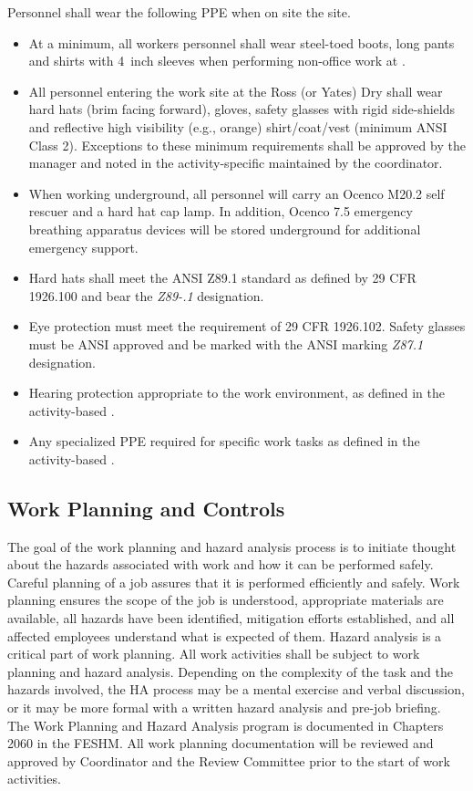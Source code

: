 Personnel shall wear the following PPE when on site the  site.
\begin{itemize}
\item At a minimum, all workers personnel shall wear
  steel-toed boots, long pants and shirts with 4~inch sleeves when
  performing non-office work at . 
  \item All personnel entering the work site at the Ross (or Yates) Dry
    shall wear hard hats (brim facing forward), gloves,
    safety glasses with rigid side-shields and reflective high
    visibility (e.g., orange) shirt/coat/vest (minimum ANSI Class 2).
    Exceptions to these minimum requirements shall be approved by the
      manager and noted in the
    activity-specific  maintained by the   coordinator.
  \item When working underground, all personnel will carry an Ocenco M20.2 self rescuer
    and a hard hat cap lamp. In addition, Ocenco 7.5 emergency breathing apparatus devices
    will be stored underground for additional emergency support.
  \item Hard hats shall meet the ANSI Z89.1 standard as defined by 29
    CFR 1926.100 and bear the {\em Z89-.1} designation.
   \item Eye protection must meet the requirement of 29 CFR
      1926.102. Safety glasses must be ANSI approved and be marked
      with the ANSI marking {\em Z87.1} designation.
    \item Hearing protection appropriate to the work environment, as
      defined in the activity-based .
    \item Any specialized PPE required for specific work tasks as
      defined in the activity-based . 
\end{itemize}

\subsection{Work Planning and Controls}

The goal of the work planning and hazard analysis process is to
initiate thought about the hazards associated with work and how it can
be performed safely. Careful planning of a job assures that it is
performed efficiently and safely. Work planning ensures the scope of
the job is understood, appropriate materials are available, all
hazards have been identified, mitigation efforts established, and all
affected employees understand what is expected of them. Hazard
analysis is a critical part of work planning. All work activities
shall be subject to work planning and hazard analysis. Depending on
the complexity of the task and the hazards involved, the HA process
may be a mental exercise and verbal discussion, or it may be more
formal with a written hazard analysis and pre-job briefing. The Work
Planning and Hazard Analysis program is documented in Chapters 2060 in
the FESHM. All work planning documentation will be reviewed and
approved by   Coordinator and the 
 Review Committee prior to the start of work activities.

